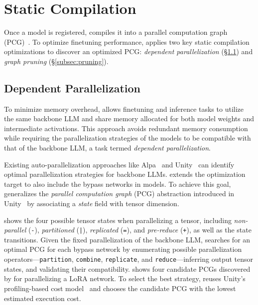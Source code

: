
\section{Static Compilation}
\label{sec:compiler}

Once a \peft model is registered, \sys compiles it into a parallel computation graph (PCG)~\cite{unger2022unity}. To optimize finetuning performance, \sys applies two key static compilation optimizations to discover an optimized PCG: {\em dependent parallelization} (\S\ref{subsec:parallelization}) and {\em graph pruning} (\S\ref{subsec:pruning}).
%

\subsection{Dependent Parallelization}
\label{subsec:parallelization}

To minimize memory overhead, \sys allows finetuning and inference tasks to utilize the same backbone LLM and share memory allocated for both model weights and intermediate activations. This approach avoids redundant memory consumption while requiring the parallelization strategies of the \peft models to be compatible with that of the backbone LLM, a task termed {\em dependent parallelization}.

Existing auto-parallelization approaches like Alpa~\cite{zheng22-alpa} and Unity~\cite{unger2022unity} can identify optimal parallelization strategies for backbone LLMs.
\Sys extends the optimization target to also include the bypass networks in \peft models.
To achieve this goal, \sys generalizes the {\em parallel computation graph} (PCG) abstraction introduced in Unity~\cite{unger2022unity} by associating a {\em state} field with tensor dimension.

 shows the four possible tensor states when parallelizing a tensor, including {\em non-parallel} ({\tt -}), {\em partitioned} ({\tt |}), {\em replicated} ({\tt =}), and {\em pre-reduce} ({\tt +}), as well as the state transitions.
Given the fixed parallelization of the backbone LLM, \sys searches for an optimal PCG for each bypass network by enumerating possible parallelization operators---{\tt partition}, {\tt combine}, {\tt replicate}, and {\tt reduce}---inferring output tensor states, and validating their compatibility.
 shows four candidate PCGs discovered by \sys for parallelizing a LoRA network. To select the best strategy, \sys reuses Unity's profiling-based cost model~\cite{unger2022unity} and chooses the candidate PCG with the lowest estimated execution cost.


